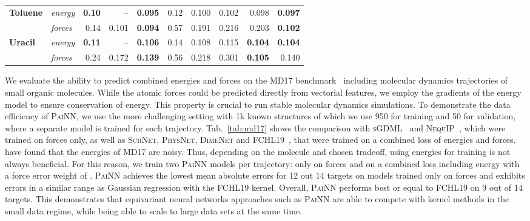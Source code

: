 \documentclass[reprint,
amsmath,amssymb,
 aip,jcp
]{revtex4-2}
\newcommand{\painn}{\textsc{PaiNN}}
\begin{document}
\begin{table*}[tb]
\begin{center}
\begin{scriptsize}
\begin{sc}
\begin{tabular}{llrrr|rrrrr}
 \multirow{2}{*}{\textbf{Toluene}} & \textit{energy} & \textbf{0.10} & -- & \textbf{0.095} & 0.12 & 0.100 & 0.102 & 0.098 & \textbf{0.097} \\
 & \textit{forces} & 0.14 & 0.101 & \textbf{0.094} & 0.57 & 0.191 & 0.216 & 0.203 & \textbf{0.102} \\ 
 \midrule
 
 \multirow{2}{*}{\textbf{Uracil}} & \textit{energy} & \textbf{0.11} & -- & \textbf{0.106} & 0.14 & 0.108 & 0.115 & \textbf{0.104} & \textbf{0.104} \\
 & \textit{forces} & 0.24 & 0.172 & \textbf{0.139} & 0.56 & 0.218 & 0.301 & \textbf{0.105} & 0.140 \\
\bottomrule
\end{tabular}
\end{sc}
\end{scriptsize}
\end{center}
\vskip -0.1in
\end{table*}

We evaluate the ability to predict combined energies and forces on the MD17 benchmark~\cite{chmiela2017machine} including molecular dynamics trajectories of small organic molecules.
While the atomic forces could be predicted directly from vectorial features, we employ the gradients of the energy model  to ensure conservation of energy.
This property is crucial to run stable molecular dynamics simulations.
To demonstrate the data efficiency of \painn{}, we use the more challenging setting with 1k known structures of which we use 950 for training and 50 for validation, where a separate model is trained for each trajectory.
Tab.~\ref{tab:md17} shows the comparison with \textsc{sGDML}~\cite{chmiela2018} and  \textsc{NequIP}~\cite{batzner2021se}, which were trained on forces only, as well as \textsc{SchNet}, \textsc{PhysNet}, \textsc{DimeNet} and \textsc{FCHL19}~\cite{christensen2020fchl}, that were trained on a combined loss of energies and forces.
\citet{christensen2020role} have found that the energies of MD17 are noisy. Thus, depending on the molecule and chosen tradeoff, using energies for training is not always beneficial.
For this reason, we train two \painn{} models per trajectory: only on forces and on a combined loss including energy with a force error weight of .
\painn{} achieves the lowest mean absolute errors for 12 out 14 targets on models trained only on forces and exhibits errors in a similar range as Gaussian regression with the \textsc{FCHL19} kernel.
Overall, \painn{} performs best or equal to \textsc{FCHL19} on 9 out of 14 targets.
This demonstrates that equivariant neural networks approaches such as \painn{} are able to compete with kernel methods in the small data regime, while being able to scale to large data sets at the same time.
\end{document}
